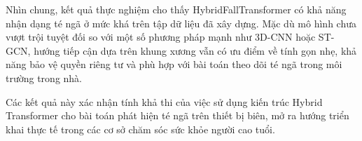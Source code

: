
Nhìn chung, kết quả thực nghiệm cho thấy HybridFallTransformer có khả năng nhận dạng té ngã ở mức khá trên tập dữ liệu đã xây dựng. Mặc dù mô hình chưa vượt trội tuyệt đối so với một số phương pháp mạnh như 3D-CNN hoặc ST-GCN, hướng tiếp cận dựa trên khung xương vẫn có ưu điểm về tính gọn nhẹ, khả năng bảo vệ quyền riêng tư và phù hợp với bài toán theo dõi té ngã trong môi trường trong nhà.

Các kết quả này xác nhận tính khả thi của việc sử dụng kiến trúc Hybrid Transformer cho bài toán phát hiện té ngã trên thiết bị biên, mở ra hướng triển khai thực tế trong các cơ sở chăm sóc sức khỏe người cao tuổi.

